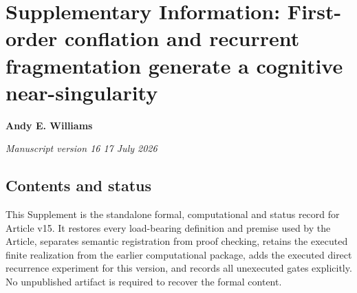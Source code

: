 \hypertarget{supplementary-information-first-order-conflation-and-recurrent-fragmentation-generate-a-cognitive-near-singularity}{%
\section{Supplementary Information: First-order conflation and recurrent
fragmentation generate a cognitive
near-singularity}\label{supplementary-information-first-order-conflation-and-recurrent-fragmentation-generate-a-cognitive-near-singularity}}

\textbf{Andy E. Williams}

\emph{Manuscript version 16 \textbar{} 17 July 2026}

\hypertarget{contents-and-status}{%
\subsection{Contents and status}\label{contents-and-status}}

This Supplement is the standalone formal, computational and status
record for Article v15. It restores every load-bearing definition and
premise used by the Article, separates semantic registration from proof
checking, retains the executed finite realization from the earlier
computational package, adds the executed direct recurrence experiment
for this version, and records all unexecuted gates explicitly. No
unpublished artifact is required to recover the formal content.


